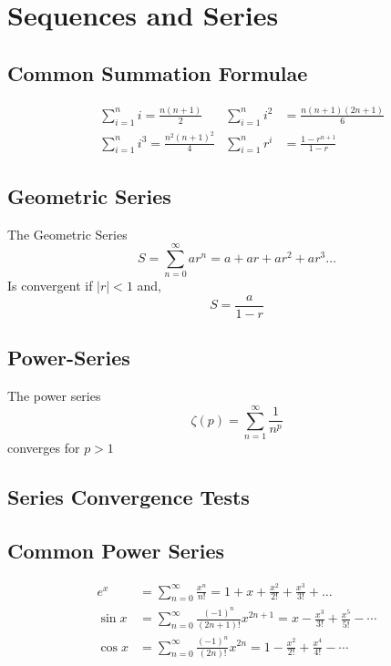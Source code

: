 \section{Sequences and Series}
\subsection{Common Summation Formulae}
\begin{align*}
&\sum_{i = 1}^{n} i = \frac{n(n+1)}{2} & \sum_{i = 1}^{n} i^2 &= \frac{n(n+1)(2n+1)}{6} \\
&\sum_{i = 1}^{n}i^3 = \frac{n^2(n+1)^2}{4} & \sum_{i = 1}^{n}r^i &= \frac{1-r^{n+1}}{1-r}
\end{align*}
\subsection{Geometric Series}
The Geometric Series
$$S = \sum_{n=0}^{\infty}{ar^{n}} = a + ar + ar^2 + ar^3\dots
$$
Is convergent if $|r|< 1$ and,
$$S = \frac{a}{1-r}$$
\subsection{Power-Series}
The power series
$$\zeta(p) = \sum_{n = 1}^{\infty} \frac{1}{n^p}$$
converges for $p>1$
\subsection{Series Convergence Tests}
\subsection{Common Power Series}
\begin{align*}
e^x &= \sum_{n=0}^{\infty}{\frac{x^n}{n!}} = 1 + x + \frac{x^2}{2!} + \frac{x^3}{3!}+\dots \\
\sin x &= \sum^{\infty}_{n=0} \frac{(-1)^n}{(2n+1)!} x^{2n+1} =  x - \frac{x^3}{3!} + \frac{x^5}{5!} - \cdots\\
\cos x &= \sum^{\infty}_{n=0} \frac{(-1)^n}{(2n)!} x^{2n} =  1 - \frac{x^2}{2!} + \frac{x^4}{4!} - \cdots \\
\end{align*}
